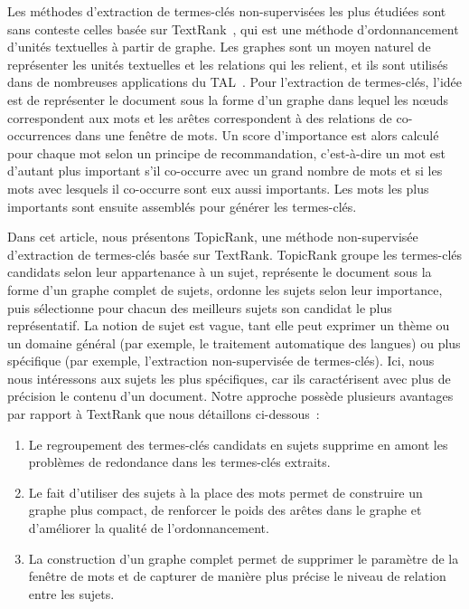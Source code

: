   Les méthodes d'extraction de termes-clés non-supervisées les plus étudiées
  sont sans conteste celles basée sur TextRank~\cite{mihalcea2004textrank}, qui
  est une méthode d'ordonnancement d'unités textuelles à partir de graphe. Les
  graphes sont un moyen naturel de représenter les unités textuelles et les
  relations qui les relient, et ils sont utilisés dans de nombreuses
  applications du TAL~\cite{kozareva2013textgraphs}. Pour l'extraction de
  termes-clés, l'idée est de représenter le document sous la forme d'un graphe
  dans lequel les n\oe{}uds correspondent aux mots et les arêtes correspondent à
  des relations de co-occurrences dans une fenêtre de mots. Un score
  d'importance est alors calculé pour chaque mot selon un principe de
  recommandation, c'est-à-dire un mot est d'autant plus important s'il
  co-occurre avec un grand nombre de mots et si les mots avec lesquels il
  co-occurre sont eux aussi importants. Les mots les plus importants sont
  ensuite assemblés pour générer les termes-clés.

  Dans cet article, nous présentons TopicRank, une méthode non-supervisée
  d'extraction de termes-clés basée sur TextRank. TopicRank groupe les
  termes-clés candidats selon leur appartenance à un sujet, représente le
  document sous la forme d'un graphe complet de sujets, ordonne les sujets selon
  leur importance, puis sélectionne pour chacun des meilleurs sujets son
  candidat le plus représentatif. La notion de sujet est vague, tant elle peut
  exprimer un thème ou un domaine général (par exemple, le traitement
  automatique des langues) ou plus spécifique (par exemple, l'extraction
  non-supervisée de termes-clés). Ici, nous nous intéressons aux sujets les plus
  spécifiques, car ils caractérisent avec plus de précision le contenu d'un
  document. Notre approche possède plusieurs avantages par rapport à TextRank
  que nous détaillons ci-dessous~:
  \begin{enumerate}
    \item{Le regroupement des termes-clés candidats en sujets supprime en amont
          les problèmes de redondance dans les termes-clés extraits.}
    \item{Le fait d'utiliser des sujets à la place des mots permet de construire
          un graphe plus compact, de renforcer le poids des arêtes dans le
          graphe et d'améliorer la qualité de l'ordonnancement.}
    \item{La construction d'un graphe complet permet de supprimer le paramètre
          de la fenêtre de mots et de capturer de manière plus précise le niveau
          de relation entre les sujets.}
  \end{enumerate}

